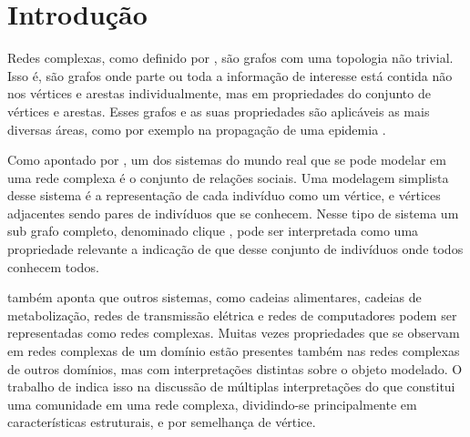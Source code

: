 \documentclass[notes.tex]{subfiles}
\begin{document}
\chapter{Introdução}

Redes complexas, como definido por , são grafos com uma topologia não trivial.
Isso é, são grafos onde parte ou toda a informação de interesse está contida não nos vértices e arestas individualmente, mas em propriedades do conjunto de vértices e arestas.
Esses grafos e as suas propriedades são aplicáveis as mais diversas áreas, como por exemplo na propagação de uma epidemia .

Como apontado por , um dos sistemas do mundo real que se pode modelar em uma rede complexa é o conjunto de relações sociais.
Uma modelagem simplista desse sistema é a representação de cada indivíduo como um vértice, e vértices adjacentes sendo pares de indivíduos que se conhecem.
Nesse tipo de sistema um sub grafo completo, denominado clique \cite{fortunato2010community}, pode ser interpretada como uma propriedade relevante a indicação de que desse conjunto de indivíduos onde todos conhecem todos.

 também aponta que outros sistemas, como cadeias alimentares, cadeias de metabolização, redes de transmissão elétrica e redes de computadores podem ser representadas como redes complexas.
Muitas vezes propriedades que se observam em redes complexas de um domínio estão presentes também nas redes complexas de outros domínios, mas com interpretações distintas sobre o objeto modelado.
O trabalho de  indica isso na discussão de múltiplas interpretações do que constitui uma comunidade em uma rede complexa, dividindo-se principalmente em características estruturais, e por semelhança de vértice.
\end{document}
